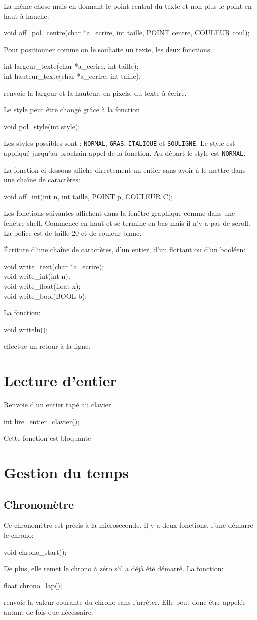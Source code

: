 \documentclass{article}
\newcommand\code[1]{
\begin{mdframed}[linecolor=purple,backgroundcolor=blue!10]
{\tt
#1
}
\end{mdframed}
}
\begin{document}
La même chose mais en donnant le point central du texte et non plus
le point en haut à hauche:
\code{
void aff\_pol\_centre(char *a\_ecrire, int taille, POINT centre, COULEUR coul);
}

Pour positionner comme on le souhaite un texte, les deux fonctions:
\code{
int largeur\_texte(char *a\_ecrire, int taille);\\
int hauteur\_texte(char *a\_ecrire, int taille);
}
renvoie la largeur et la hauteur, en pixels, du texte à écrire.

Le style peut être changé grâce à la fonction
\code{
void pol\_style(int style);
}
Les styles possibles sont : \texttt{NORMAL}, \texttt{GRAS}, \texttt{ITALIQUE} et 
\texttt{SOULIGNE}. Le style est appliqué jusqu'au prochain appel de la fonction.
Au départ le style est \texttt{NORMAL}.

La fonction ci-dessous affiche directement un entier sans avoir 
à le mettre dans une chaîne de caractères:
\code{
void aff\_int(int n, int taille, POINT p, COULEUR C);
}

Les fonctions suivantes affichent dans la fenêtre graphique comme dans 
une fenêtre shell. Commence en haut et se termine en bas mais il n'y a
pas de scroll. La police est de taille 20 et de couleur blanc.

\'Ecriture d'une chaîne de caractères, d'un entier, d'un flottant ou d'un booléen:
\code{
void write\_text(char *a\_ecrire);\\
void write\_int(int n);\\
void write\_float(float x);\\
void write\_bool(BOOL b);
}

La fonction:
\code{
void writeln();
}
effectue un retour à la ligne.

\section{Lecture d'entier}
Renvoie d'un entier tapé au clavier. 
\code{
int lire\_entier\_clavier();
}
Cette fonction est bloquante


\section{Gestion du temps}

\subsection{Chronomètre}
Ce chronomètre est précis à la microseconde.
Il y a deux fonctions, l'une démarre le chrono:
\code{
void chrono\_start();
}
De plus, elle remet le chrono à zéro s'il a déjà été démarré.
La fonction:
\code{
float chrono\_lap();
}
renvoie la valeur courante du chrono sans l'arrêter.
Elle peut donc être appelée autant de fois que nécéssaire.
\end{document}
